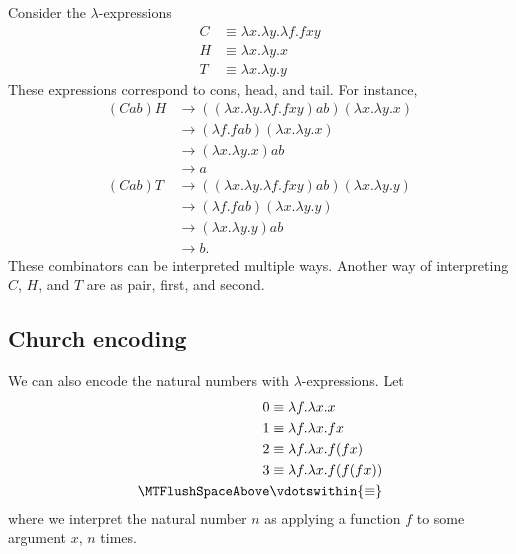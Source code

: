 \documentclass[class=scrartcl]{standalone}
\begin{document}
\begin{example} %
  Consider the \(\lambda\)-expressions
  \begin{align*}
    C &\equiv \lambda x. \lambda y. \lambda f. f x y \\
    H &\equiv \lambda x. \lambda y. x \\
    T &\equiv \lambda x. \lambda y. y
  \end{align*}
  These expressions correspond to
    \textsf{cons},
    \textsf{head}, and
    \textsf{tail}.
  For instance,
  \begin{align*}
    (C a b) H &\to ((\lambda x. \lambda y. \lambda f. f x y) a b)
                   (\lambda x. \lambda y. x) \\
              &\to (\lambda f. f a b)
                   (\lambda x. \lambda y. x) \\
              &\to (\lambda x. \lambda y. x) a b \\
              &\to a \\
    (C a b) T &\to ((\lambda x. \lambda y. \lambda f. f x y) a b)
                   (\lambda x. \lambda y. y) \\
              &\to (\lambda f. f a b)
                   (\lambda x. \lambda y. y) \\
              &\to (\lambda x. \lambda y. y) a b \\
              &\to b.
  \end{align*}
  These combinators can be interpreted multiple ways.
  Another way of interpreting \(C\), \(H\), and \(T\) are as
    \textsf{pair},
    \textsf{first}, and
    \textsf{second}.
\end{example}

\subsection{Church encoding}
We can also encode the natural numbers with \(\lambda\)-expressions.
Let
\begin{align*}
  0 &\equiv \lambda f. \lambda x. x \\
  1 &\equiv \lambda f. \lambda x. f x \\
  2 &\equiv \lambda f. \lambda x. f (f x) \\
  3 &\equiv \lambda f. \lambda x. f (f (f x)) \\
    \MTFlushSpaceAbove
    &\vdotswithin{\equiv}
\end{align*}
where we interpret the natural number \(n\) as
applying a function \(f\) to some argument \(x\), \(n\) times.
\end{document}

